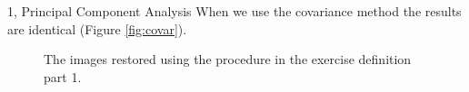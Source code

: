 \begin{task}{1, Principal Component Analysis}
When we use the covariance method the results are identical (Figure \ref{fig:covar}).

\begin{figure}[H]
    \centering
    \caption{The images restored using the procedure in the exercise definition part 1.}
    \label{fig:plotImagePCAdirect1}
\end{figure}
\begin{figure}[H]
    \centering

\end{figure}
\end{task}
